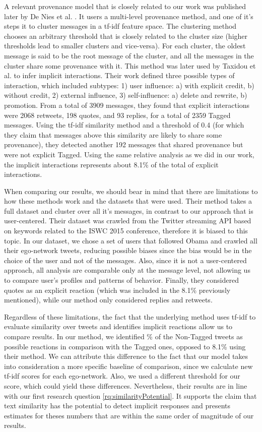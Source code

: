 A relevant provenance model that is closely related to our work was published later by De Nies et al. \cite{de2015}. It users a multi-level provenance method, and one of it's steps it to cluster messages in a tf-idf feature space. The clustering method chooses an arbitrary threshold that is closely related to the cluster size (higher thresholds lead to smaller clusters and vice-versa). For each cluster, the oldest message is said to be the root message of the cluster, and all the messages in the cluster share some provenance with it. This method was later used by Taxidou et al. \cite{taxidou2016} to infer implicit interactions. Their work defined three possible types of interaction, which included subtypes: 1) user influence: a) with explicit credit, b) without credit, 2) external influence, 3) self-influence: a) delete and rewrite, b) promotion. From a total of 3909 messages, they found that explicit interactions were 2068 retweets, 198 quotes, and 93 replies, for a total of 2359 Tagged messages. Using the tf-idf similarity method and a threshold of 0.4 (for which they claim that messages above this similarity are likely to share some provenance), they detected another 192 messages that shared provenance but were not explicit Tagged. Using the same relative analysis as we did in our work, the implicit interactions represents about 8.1\% of the total of explicit interactions.

When comparing our results, we should bear in mind that there are limitations to how these methods work and the datasets that were used. Their method takes a full dataset and cluster over all it's messages, in contrast to our approach that is user-centered. Their dataset was crawled from the Twitter streaming API based on keywords related to the ISWC 2015 conference, therefore it is biased to this topic. In our dataset, we chose a set of users that followed Obama and crawled all their ego-network tweets, reducing possible biases since the bias would be in the choice of the user and not of the messages. Also, since it is not a user-centered approach, all analysis are comparable only at the message level, not allowing us to compare user's profiles and patterns of behavior. Finally, they considered quotes as an explicit reaction (which was included in the 8.1\% previously mentioned), while our method only considered replies and retweets.

Regardless of these limitations, the fact that the underlying method uses tf-idf to evaluate similarity over tweets and identifies implicit reactions allow us to compare results. In our method, we identified \highNonTaggedTweetCountPct{}\% of the Non-Tagged tweets as possible reactions in comparison with the Tagged ones, opposed to 8.1\% using their method. We can attribute this difference to the fact that our model takes into consideration a more specific baseline of comparison, since we calculate new tf-idf scores for each ego-network. Also, we used a different threshold for our score, which could yield these differences. Nevertheless, their results are in line with our first research question \ref{rq:similarityPotential}. It supports the claim that text similarity has the potential to detect implicit responses and presents estimates for theses numbers that are within the same order of magnitude of our results.

